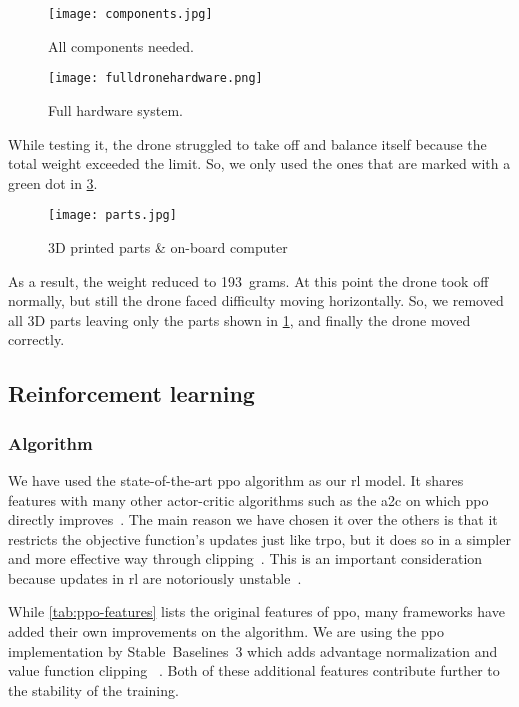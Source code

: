 \documentclass[../main.tex]{subfiles}
\begin{document}
\begin{figure}[tbp]
	\centering
	\texttt{[image: components.jpg]}
	\caption{All components needed.}
	\label{fig:components}
\end{figure}

\begin{figure}[tbp]
	\centering
	\texttt{[image: fulldronehardware.png]}
	\caption{Full hardware system.}
	\label{fig:full-hardware}
\end{figure}  

While testing it, the drone struggled to take off and balance itself
because the total weight exceeded the limit. So, we
only used the ones that are marked with a green dot in
\cref{fig:printed-parts}. 

\begin{figure}[tbp]
	\centering
	\texttt{[image: parts.jpg]}
	\caption{3D printed parts \& on-board computer}
	\label{fig:printed-parts}
\end{figure} 

As a result, the weight reduced to \SI{193}{grams}. 
At this point the drone took off normally, but still the drone faced
difficulty moving horizontally. 
So, we removed all 3D parts leaving only the parts shown in
\cref{fig:components}, and finally the drone moved correctly.
 
\subsection{Reinforcement learning}

\subsubsection{Algorithm}

We have used the state-of-the-art \gls{ppo} algorithm as our \gls{rl}
model. 
It shares features with many other actor-critic algorithms such
as the \gls{a2c} on which \gls{ppo} directly improves~\cite{ppo}.
The main reason we have chosen it over the others is that it restricts
the objective function's updates just like \gls{trpo}, but it does so
in a simpler and more effective way through clipping~\cite{ppo}.
This is an important consideration because updates in \gls{rl} are
notoriously unstable~\cite{Hen18}. 

While \cref{tab:ppo-features} lists the original features of \gls{ppo},
many frameworks have added their own improvements on the algorithm.
We are using the \gls{ppo} implementation by Stable~Baselines~3
which adds advantage normalization and value function clipping%
~\cite{sb3}.
Both of these additional features contribute further to the stability
of the training.
\end{document}

